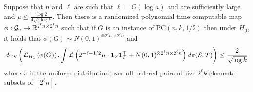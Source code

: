 \documentclass[11pt]{article}
\begin{document}
\begin{lemma}
Suppose that $n$ and $\ell$ are such that $\ell = O(\log n)$ and are sufficiently large and $\mu \le \frac{\log 2}{4 \sqrt{3 \log k}}$. Then there is a randomized polynomial time computable map $\phi : \mathcal{G}_n \to \mathbb{R}^{2^\ell n \times 2^\ell n}$ such that if $G$ is an instance of $\text{PC}(n, k, 1/2)$ then under $H_0$, it holds that $\phi(G) \sim N(0, 1)^{\otimes 2^\ell n \times 2^\ell n}$ and
$$d_{\text{TV}}\left( \mathcal{L}_{H_1}\left( \phi(G) \right), \int \mathcal{L}\left(2^{-\ell-1/2} \mu \cdot \mathbf{1}_S \mathbf{1}_T^\top + N(0, 1)^{\otimes 2^\ell n \times 2^\ell n} \right) d\pi(S, T) \right) \le \frac{2}{\sqrt{\log k}}$$
where $\pi$ is the uniform distribution over all ordered pairs of size $2^\ell k$ elements subsets of $[2^\ell n]$.
\end{lemma}
\end{document}
